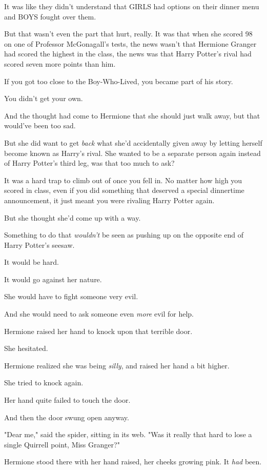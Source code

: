 It was like they didn't understand that GIRLS had options on their dinner menu 
and BOYS fought over them.

But that wasn't even the part that hurt, really. It was that when she scored 98 
on one of Professor McGonagall's tests, the news wasn't that Hermione Granger 
had scored the highest in the class, the news was that Harry Potter's rival had 
scored seven more points than him.

If you got too close to the Boy-Who-Lived, you became part of his story.

You didn't get your own.

And the thought had come to Hermione that she should just walk away, but that 
would've been too sad.

But she did want to get \emph{back} what she'd accidentally given away by 
letting herself become known as Harry's rival. She wanted to be a separate 
person again instead of Harry Potter's third leg, was that too much to ask?

It was a hard trap to climb out of once you fell in. No matter how high you 
scored in class, even if you did something that deserved a special dinnertime 
announcement, it just meant you were rivaling Harry Potter again.

But she thought she'd come up with a way.

Something to do that \emph{wouldn't} be seen as pushing up on the opposite end 
of Harry Potter's seesaw.

It would be hard.

It would go against her nature.

She would have to fight someone very evil.

And she would need to ask someone even \emph{more} evil for help.

Hermione raised her hand to knock upon that terrible door.

She hesitated.

Hermione realized she was being \emph{silly}, and raised her hand a bit higher.

She tried to knock again.

Her hand quite failed to touch the door.

And then the door swung open anyway.

"Dear me," said the spider, sitting in its web. "Was it really that hard to 
lose a single Quirrell point, Miss Granger?"

Hermione stood there with her hand raised, her cheeks growing pink. It 
\emph{had} been.

